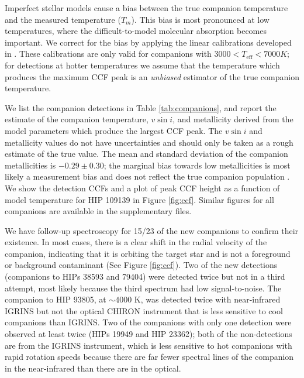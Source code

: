 \documentclass{emulateapj}
\begin{document}
Imperfect stellar models cause a bias between the true companion temperature and the measured temperature ($T_m$). This bias is most pronounced at low temperatures, where the difficult-to-model molecular absorption becomes important. We correct for the bias by applying the linear calibrations developed in \citet{Gullikson2016}. These calibrations are only valid for companions with $3000 < T_\mathrm{eff} < 7000 K$; for detections at hotter temperatures we assume that the temperature which produces the maximum CCF peak is an \emph{unbiased} estimator of the true companion temperature.

We list the companion detections in Table \ref{tab:companions}, and report the estimate of the companion temperature, $v\sin{i}$, and metallicity derived from the model parameters which produce the largest CCF peak. The $v\sin{i}$ and metallicity values do not have uncertainties and should only be taken as a rough estimate of the true value. The mean and standard deviation of the companion metallicities is $-0.29 \pm 0.30$; the marginal bias towards low metallicities is most likely a measurement bias and does not reflect the true companion population \citep{Gullikson2016}.  We show the detection CCFs and a plot of peak CCF height as a function of model temperature for HIP 109139 in Figure \ref{fig:ccf}. Similar figures for all companions are available in the supplementary files.


We have follow-up spectroscopy for 15/23 of the new companions to confirm their existence. In most cases, there is a clear shift in the radial velocity of the companion, indicating that it is orbiting the target star and is not a foreground or background contaminant (See Figure \ref{fig:ccf}). Two of the new detections (companions to HIPs 38593 and 79404) were detected twice but not in a third attempt, most likely because the third spectrum had low signal-to-noise. The companion to HIP 93805, at $\sim 4000$ K, was detected twice with near-infrared IGRINS but not the optical CHIRON instrument that is less sensitive to cool companions than IGRINS. Two of the companions with only one detection were observed at least twice (HIPs 19949 and HIP 23362); both of the non-detections are from the IGRINS instrument, which is less sensitive to hot companions with rapid rotation speeds because there are far fewer spectral lines of the companion in the near-infrared than there are in the optical.
\end{document}
